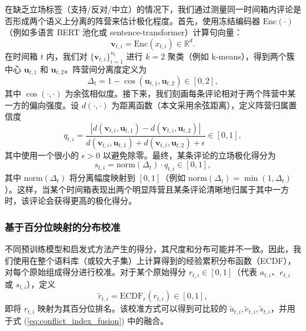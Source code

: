 \documentclass[conference]{IEEEtran}
\begin{document}
在缺乏立场标签（支持/反对/中立）的情况下，我们通过测量同一时间箱内评论是否形成两个语义上分离的阵营来估计极化程度。首先，使用冻结编码器 $\mathrm{Enc}(\cdot)$（例如多语言 BERT 池化或 sentence-transformer）计算句向量：
\begin{equation}
\mathbf{v}_{t,i} = \mathrm{Enc}(x_{t,i}) \in \mathbb{R}^d.
\label{eq:embedding}
\end{equation}
在时间箱 $t$ 内，我们对 $\{\mathbf{v}_{t,i}\}_{i=1}^{n_t}$ 进行 $k{=}2$ 聚类（例如 k-means），得到两个簇中心 $\mathbf{u}_{t,1}$ 和 $\mathbf{u}_{t,2}$。阵营间分离度定义为
\begin{equation}
\Delta_t = 1 - \cos(\mathbf{u}_{t,1}, \mathbf{u}_{t,2}) \in [0,2],
\label{eq:camp_separation}
\end{equation}
其中 $\cos(\cdot,\cdot)$ 为余弦相似度。接下来，我们刻画每条评论相对于两个阵营中某一方的偏向强度。设 $d(\cdot,\cdot)$ 为距离函数（本文采用余弦距离），定义阵营归属置信度
\begin{equation}
q_{t,i} = \frac{\left|d(\mathbf{v}_{t,i},\mathbf{u}_{t,1}) - d(\mathbf{v}_{t,i},\mathbf{u}_{t,2})\right|}
{d(\mathbf{v}_{t,i},\mathbf{u}_{t,1}) + d(\mathbf{v}_{t,i},\mathbf{u}_{t,2}) + \epsilon} \in [0,1],
\label{eq:alignment_confidence}
\end{equation}
其中使用一个很小的 $\epsilon>0$ 以避免除零。最终，某条评论的立场极化得分为
\begin{equation}
s_{t,i} = \mathrm{norm}(\Delta_t)\cdot q_{t,i} \in [0,1],
\label{eq:stance_score}
\end{equation}
其中 $\mathrm{norm}(\Delta_t)$ 将分离幅度映射到 $[0,1]$（例如 $\mathrm{norm}(\Delta_t)=\min(1,\Delta_t)$）。这样，当某个时间箱表现出两个明显阵营且某条评论清晰地归属于其中一方时，该评论会获得更高的极化得分。

\subsubsection{基于百分位映射的分布校准}\label{sec:calibration}

不同预训练模型和启发式方法产生的得分，其尺度和分布可能并不一致。因此，我们使用在整个语料库（或较大子集）上计算得到的经验累积分布函数（ECDF），对每个原始组成得分进行校准。对于某个原始得分 $r_{t,i}\in[0,1]$（代表 $a_{t,i}$、$e_{t,i}$ 或 $s_{t,i}$），定义
\begin{equation}
\tilde{r}_{t,i} = \mathrm{ECDF}_r(r_{t,i}) \in [0,1],
\label{eq:ecdf}
\end{equation}
即将 $r_{t,i}$ 映射为其百分位排名。该校准方式可以得到可比较的 $\tilde{a}_{t,i},\tilde{e}_{t,i},\tilde{s}_{t,i}$，并用于式 (\ref{eq:conflict_index_fusion}) 中的融合。
\end{document}
